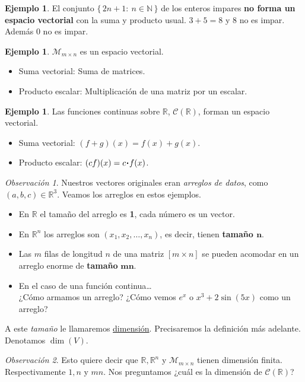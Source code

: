\documentclass[12pt]{article}
\theoremstyle{plain}
\theoremstyle{definition}
\newtheorem{Ex}[Th]{Ejemplo}           %
\theoremstyle{remark}
\newtheorem*{Rmk}{Observación}      %
\newcommand{\bN}{\mathbb{N}}        %
\newcommand{\bR}{\mathbb{R}}        %
\newcommand{\cC}{\mathcal{C}}       %
\newcommand{\cM}{\mathcal{M}}       %
\newcommand{\x}{\times}             %
\renewcommand{\:}{\colon}           %
\newcommand{\un}[1]{\underline{#1}}
\renewcommand{\.}{\Cdot}                %
\newcommand{\set}[1]{\{\,#1\,\}}    %
\begin{document}
\begin{multicols}{2}
\begin{Ex} 
El conjunto $\set{2n+1:\ n\in\bN}$ de los enteros impares \textbf{no forma un espacio vectorial} con la suma y producto usual. $3+5=8$ y $8$ no es impar. Además $0$ no es impar.
\end{Ex}

\begin{Ex}
  $\cM_{m\x n}$ es un espacio vectorial. 
  \begin{itemize}
    \itemsep=-0.4em
    \item Suma vectorial: Suma de matrices.
    \item Producto escalar: Multiplicación de una matriz por un escalar.
  \end{itemize}
\end{Ex}

\begin{Ex}
  Las funciones continuas sobre $\bR$, $\cC(\bR)$, forman un espacio vectorial. 
  \begin{itemize}
    \itemsep=-0.4em
    \item Suma vectorial: $(f+g)(x)=f(x)+g(x)$.
    \item Producto escalar: $(cf)(x)=c\.f(x)$.
  \end{itemize}
\end{Ex}

\begin{Rmk}
Nuestros vectores originales eran \emph{arreglos de datos}, como $(a,b,c)\in\bR^3$. Veamos los arreglos en estos ejemplos.
\begin{itemize}
  \itemsep=-0.4em
  \item En $\bR$ el tamaño del arreglo es \textbf{1}, cada número es un vector. 
  \item En $\bR^n$ los arreglos son $(x_1,x_2,\dots,x_n)$, es decir, tienen \textbf{tamaño $\mathbf{n}$}.
  \item Las $m$ filas de longitud $n$ de una matriz $[m\x n]$ se pueden acomodar en un arreglo enorme de \textbf{tamaño} $\mathbf{mn}$.
  \item En el caso de una función continua\dots\\¿Cómo armamos un arreglo? ¿Cómo vemos $e^x$ o $x^3+2\sin(5x)$ como un arreglo?
\end{itemize}
\end{Rmk}

A este \emph{tamaño} le llamaremos \un{dimensión}. Precisaremos la definición más adelante. Denotamos $\dim(V)$.

\begin{Rmk}
  Esto quiere decir que $\bR,\bR^n$ y $\cM_{m\x n}$ tienen dimensión finita. Respectivamente $1,n$ y $mn$. Nos preguntamos ¿cuál es la dimensión de $\cC(\bR)$?
\end{Rmk}


\end{multicols}
\end{document}
